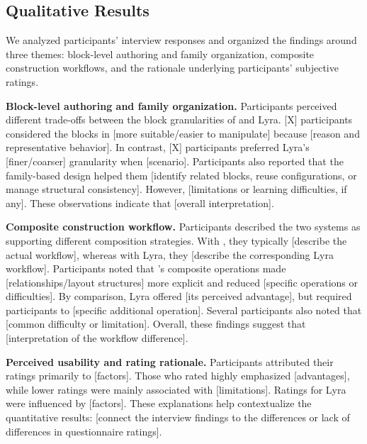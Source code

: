 \subsection{Qualitative Results}

We analyzed participants' interview responses and organized the findings
around three themes: block-level authoring and family organization, composite
construction workflows, and the rationale underlying participants'
subjective ratings.

\textbf{Block-level authoring and family organization.}
Participants perceived different trade-offs between the block granularities
of {\system} and Lyra. [X] participants considered the blocks in {\system}
[more suitable/easier to manipulate] because [reason and representative
behavior]. In contrast, [X] participants preferred Lyra's [finer/coarser]
granularity when [scenario]. Participants also reported that the family-based
design helped them [identify related blocks, reuse configurations, or manage
structural consistency]. However, [limitations or learning difficulties, if
any]. These observations indicate that [overall interpretation].


\textbf{Composite construction workflow.}
Participants described the two systems as supporting different composition
strategies. With {\system}, they typically [describe the actual workflow],
whereas with Lyra, they [describe the corresponding Lyra workflow].
Participants noted that {\system}'s composite operations made
[relationships/layout structures] more explicit and reduced [specific
operations or difficulties]. By comparison, Lyra offered [its perceived
advantage], but required participants to [specific additional operation].
Several participants also noted that [common difficulty or limitation].
Overall, these findings suggest that [interpretation of the workflow
difference].


\textbf{Perceived usability and rating rationale.}
Participants attributed their ratings primarily to [factors]. Those who
rated {\system} highly emphasized [advantages], while lower ratings were
mainly associated with [limitations]. Ratings for Lyra were influenced by
[factors]. These explanations help contextualize the quantitative results:
[connect the interview findings to the differences or lack of differences
in questionnaire ratings].